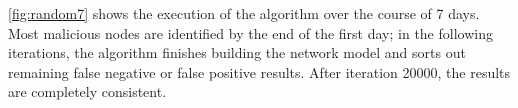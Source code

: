 \documentclass[conference]{IEEEtran}
\begin{document}
\autoref{fig:random7} shows the execution of the algorithm over the course of 7 days.
Most malicious nodes are identified by the end of the first day; in the following iterations, the algorithm finishes building the network model and sorts out remaining false negative or false positive results.
After iteration 20000, the results are completely consistent.



%
%
%



\end{document}
